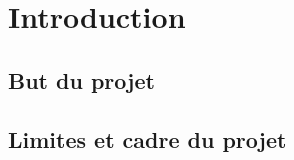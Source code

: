 \chapter{Introduction}
\label{sec:introduction}
\thispagestyle{fancy}

\lipsum[6]

\section{But du projet}

\lipsum[6]

\section{Limites et cadre du projet}

\lipsum[6]

\clearemptydoublepage

